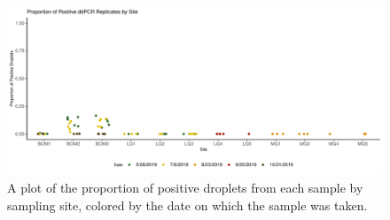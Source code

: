 \documentclass[12pt]{article}\usepackage[]{graphicx}\usepackage[]{color}
\makeatletter
\def\maxwidth{ %
  \ifdim\Gin@nat@width>\linewidth
    \linewidth
  \else
    \Gin@nat@width
  \fi
}
\newenvironment{knitrout}{}{} %
\def\maxwidth{ %
  \ifdim\Gin@nat@width>\linewidth
    \linewidth
  \else
    \Gin@nat@width
  \fi
}
\newenvironment{knitrout}{}{} %
\makeatother
\begin{document}
\begin{knitrout}
\color{fgcolor}\begin{figure}

{\centering \includegraphics[width=\maxwidth]{figure/eDNA_visualization_droplets-1} 

}

\caption[A plot of the proportion of positive droplets from each sample by sampling site, colored by the date on which the sample was taken]{A plot of the proportion of positive droplets from each sample by sampling site, colored by the date on which the sample was taken.}\label{fig:eDNA_dropletseDNA_visualization_droplets}
\end{figure}


\end{knitrout}
\end{document}
